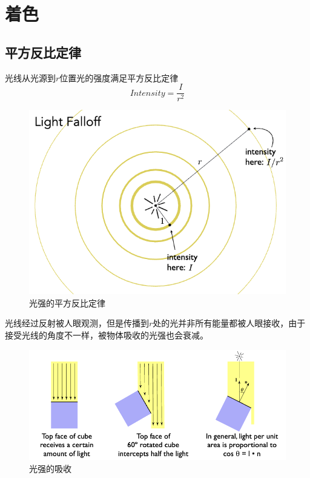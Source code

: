 \chapter{着色}

\section{平方反比定律}

光线从光源到$r$位置光的强度满足平方反比定律
\begin{equation}
    Intensity=\frac{I}{r^2}
\end{equation}
\begin{figure}[H]
    \centering
    \includegraphics[scale=0.4]{figures/光强的平方反比定律.png}
    \caption[short]{光强的平方反比定律}
\end{figure}

光线经过反射被人眼观测，但是传播到$r$处的光并非所有能量都被人眼接收，由于接受光线的角度不一样，被物体吸收的光强也会衰减。

\begin{figure}[H]
    \centering
    \includegraphics[scale=0.4]{figures/光强衰减.png}
    \caption[short]{光强的吸收}
\end{figure}

